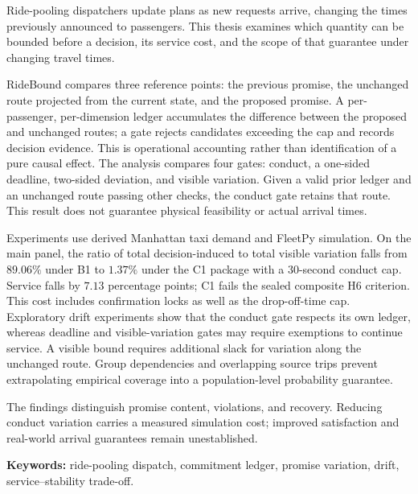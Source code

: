 Ride-pooling dispatchers update plans as new requests arrive, changing the times
previously announced to passengers. This thesis examines which quantity can be bounded
before a decision, its service cost, and the scope of that guarantee under changing
travel times.

RideBound compares three reference points: the previous promise, the unchanged route
projected from the current state, and the proposed promise. A per-passenger,
per-dimension ledger accumulates the difference between the proposed and unchanged
routes; a gate rejects candidates exceeding the cap and records decision evidence.
This is operational accounting rather than identification of a pure causal effect.
The analysis compares four gates: conduct, a one-sided deadline, two-sided deviation,
and visible variation. Given a valid prior ledger and an unchanged route passing other
checks, the conduct gate retains that route. This result does not guarantee physical
feasibility or actual arrival times.

Experiments use derived Manhattan taxi demand and FleetPy simulation. On the main panel,
the ratio of total decision-induced to total visible variation falls from $89.06\%$
under B1 to $1.37\%$ under the C1 package with a 30-second conduct cap. Service falls
by $7.13$ percentage points; C1 fails the sealed composite H6 criterion. This cost
includes confirmation locks as well as the drop-off-time cap. Exploratory drift
experiments show that the conduct gate respects its own ledger, whereas deadline and
visible-variation gates may require exemptions to continue service. A visible bound
requires additional slack for variation along the unchanged route. Group dependencies
and overlapping source trips prevent extrapolating empirical coverage into a
population-level probability guarantee.

The findings distinguish promise content, violations, and recovery. Reducing conduct
variation carries a measured simulation cost; improved satisfaction and real-world
arrival guarantees remain unestablished.

\vspace{6pt}
\noindent\textbf{Keywords:} ride-pooling dispatch, commitment ledger, promise variation,
drift, service--stability trade-off.

\clearpage
